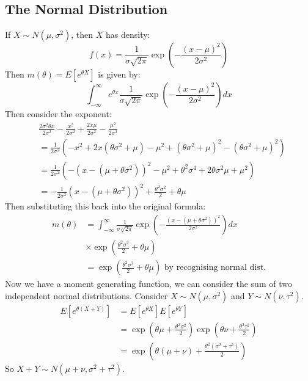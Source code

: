 \documentclass[../Main.tex]{subfiles}
\begin{document}
\subsection{The Normal Distribution}
If $X \sim N(\mu, \sigma^2)$, then $X$ has density:
\begin{equation*}
    f(x) = \frac{1}{\sigma\sqrt{2\pi}} \exp\left(-\frac{(x - \mu)^2}{2\sigma^2}\right)
\end{equation*}
Then $m(\theta) = E[e^{\theta X}]$ is given by:
\begin{equation*}
    \int_{-\infty}^\infty e^{\theta x} \frac{1}{\sigma\sqrt{2\pi}} \exp\left(-\frac{(x - \mu)^2}{2\sigma^2}\right) dx
\end{equation*}
Then consider the exponent:
\begin{align*}
    &\frac{2\sigma^2\theta x}{2\sigma^2} - \frac{x^2}{2\sigma^2} + \frac{2x\mu}{2\sigma^2} - \frac{\mu^2}{2\sigma^2} \\
    &= \frac{1}{2\sigma^2}\left(-x^2 + 2x(\theta \sigma^2 + \mu) - \mu^2 + (\theta \sigma^2 + \mu)^2 - (\theta \sigma^2 + \mu)^2\right) \\
    &= \frac{1}{2\sigma^2}\left(-(x - (\mu + \theta \sigma^2))^2 - \mu^2 + \theta^2 \sigma^4 + 2\theta \sigma^2 \mu + \mu^2\right) \\
    &= -\frac{1}{2\sigma^2}(x - (\mu + \theta \sigma^2))^2 + \frac{\theta^2 \sigma^2}{2} + \theta \mu
\end{align*}
Then substituting this back into the original formula:
\begin{align*}
    m(\theta) &= \int_{-\infty}^\infty \frac{1}{\sigma\sqrt{2\pi}} \exp\left(-\frac{(x - (\mu + \theta \sigma^2))^2}{2\sigma^2}\right)dx \\
    &\times \exp\left(\frac{\theta^2 \sigma^2}{2} + \theta \mu\right) \\
    &= \exp\left(\frac{\theta^2 \sigma^2}{2} + \theta \mu\right) \text{ by recognising normal dist.}
\end{align*}
Now we have a moment generating function, we can consider the sum of two independent normal distributions. Consider $X \sim N(\mu, \sigma^2)$ and $Y \sim N(\nu, \tau^2)$.
\begin{align*}
    E[e^{\theta(X + Y)}] &= E[e^{\theta X}] E[e^{\theta Y}] \\
    &= \exp\left(\theta \mu + \frac{\theta^2 \sigma^2}{2}\right) \exp\left(\theta \nu + \frac{\theta^2 \tau^2}{2}\right) \\
    &= \exp\left(\theta (\mu + \nu) + \frac{\theta^2 (\sigma^2 + \tau^2)}{2}\right)
\end{align*}
So $X + Y \sim N(\mu + \nu, \sigma^2 + \tau^2)$.
\end{document}
